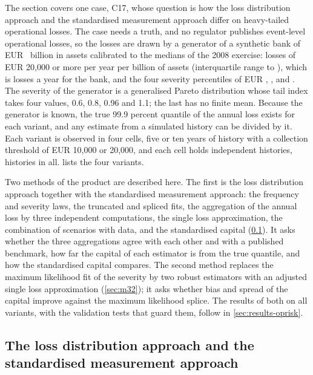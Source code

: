 The section covers one case, C17, whose question is how the loss distribution approach and the standardised measurement
approach differ on heavy-tailed operational losses. The case needs a truth, and no regulator publishes event-level
operational losses, so the losses are drawn by a generator of a synthetic bank of EUR~\opAssets{} billion in assets calibrated to
the medians of the 2008 exercise: \opLdceFreq{} losses of EUR 20,000 or more per year per billion of assets (interquartile range
\opLdceIqrLo{} to \opLdceIqrHi{}), which is \opExpCount{} losses a year for the bank, and the four severity percentiles of EUR \opPA{},
\opPB{}, \opPC{} and \opPD{} \citep{oprisk:bcbs160}. The severity of the generator is a generalised Pareto distribution whose tail
index takes four values, 0.6, 0.8, 0.96 and 1.1; the last has no finite mean. Because the generator is known, the true 99.9
percent quantile of the annual loss exists for each variant, and any estimate from a simulated history can be divided by it. Each
variant is observed in four cells, five or ten years of history with a collection threshold of EUR 10,000 or 20,000, and each
cell holds \opNRep{} independent histories, \opNHist{} histories in all.  lists the four variants.



Two methods of the product are described here. The first is the loss distribution approach together with the standardised
measurement approach: the frequency and severity laws, the truncated and spliced fits, the aggregation of the annual loss by three
independent computations, the single loss approximation, the combination of scenarios with data, and the standardised capital
(\cref{sec:m24}). It asks whether the three aggregations agree with each other and with a published benchmark, how far the capital
of each estimator is from the true quantile, and how the standardised capital compares. The second method replaces
the maximum likelihood fit of the severity by two robust estimators with an adjusted single loss approximation
(\cref{sec:m32}); it asks whether bias and spread of the capital improve against the maximum likelihood splice. The results of both
on all variants, with the validation tests that guard them, follow in \cref{sec:results-oprisk}.

\subsection{The loss distribution approach and the standardised measurement approach}
\label{sec:m24}

